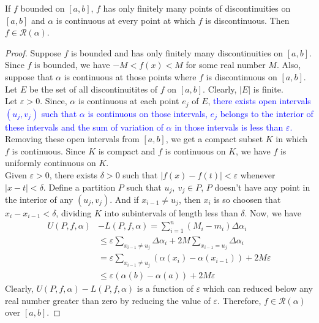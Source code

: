 \begin{theorem}
	If $f$ bounded on $[a,b]$, $f$ has only finitely many points of discontinuities on $[a,b]$ and $\alpha$ is continuous at every point at which $f$ is discontinuous.
	Then $f \in \mathscr{R}(\alpha)$.
\end{theorem}
\begin{proof}
	Suppose $f$ is bounded and has only finitely many discontinuities on $[a,b]$.
	Since $f$ is bounded, we have $-M < f(x) < M$ for some real number $M$.
	Also, suppose that $\alpha$ is continuous at those points where $f$ is discontinuous on $[a,b]$.\\

	Let $E$ be the set of all discontinuitites of $f$ on $[a,b]$.
	Clearly, $|E|$ is finite.\\

	Let $\varepsilon > 0$.
	Since, $\alpha$ is continuous at each point $e_j$ of $E$, \textcolor{blue}{there exists open intervals $(u_j,v_j)$ such that $\alpha$ is continuous on those intervals, $e_j$ belongs to the interior of these intervals and the sum of variation of $\alpha$ in those intervals is less than $\varepsilon$.}\\

	Removing these open intervals from $[a,b]$, we get a compact subset $K$ in which $f$ is continuous.
	Since $K$ is compact and $f$ is continuous on $K$, we have $f$ is uniformly continuous on $K$.\\

	Given $\varepsilon > 0$, there exists $\delta > 0$ such that $|f(x)-f(t)| < \varepsilon$ whenever $|x-t|<\delta$.
	Define a partition $P$ such that $u_j,\ v_j \in P$, $P$ doesn't have any point in the interior of any $(u_j,v_j)$.
	And if $x_{i-1} \ne u_j$, then $x_i$ is so choosen that $x_i-x_{i-1} < \delta$, dividing $K$ into subintervals of length less than $\delta$.
	Now, we have
	\begin{align*}
		U(P,f,\alpha) & - L(P,f,\alpha)
		 = \sum_{i=1}^n (M_i-m_i) \Delta \alpha_i  \\
		& \le \varepsilon \sum_{x_{i-1} \ne u_j} \Delta\alpha_i + 2M\sum_{x_{i-1} = u_j} \Delta\alpha_i \\
		& = \varepsilon \sum_{x_{i-1} \ne u_j} \left(\alpha(x_i)-\alpha(x_{i-1}) \right) + 2M\varepsilon \\
		& \le \varepsilon (\alpha(b)-\alpha(a)) + 2M\varepsilon
	\end{align*}
	Clearly, $U(P,f,\alpha)-L(P,f,\alpha)$ is a function of $\varepsilon$ which can reduced below any real number greater than zero by reducing the value of $\varepsilon$.
	Therefore, $f \in \mathscr{R}(\alpha)$ over $[a,b]$.
\end{proof}

